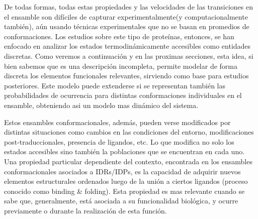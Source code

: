 De todas formas, todas estas propiedades y las velocidades de las transiciones en el ensamble son difíciles de capturar experimentalmente(y computacionalmente también), aún usando técnicas experimentales que no se basan en promedios de conformaciones.
Los estudios sobre este tipo de proteínas, entonces, se han enfocado en analizar los estados termodinámicamente accesibles como entidades discretas.
Como veremos a continuación y en las proximas secciones, esta idea, si bien sabemos que es una descripción incompleta, permite modelar de forma discreta los elementos funcionales relevantes, sirviendo como base para estudios posteriores.
Este modelo puede extenderse si se representan también las probabilidades de ocurrencia para distintas conformaciones individuales en el ensamble, obteniendo asi un modelo mas dinámico del sistema.






Estos ensambles conformacionales, además, pueden verse modificados por distintas situaciones como cambios en las condiciones del entorno, modificaciones post-traduccionales, presencia de ligandos, etc.
Lo que modifica no solo los estados accesibles sino también la poblaciones que se encuentran en cada uno.
Una propiedad particular dependiente del contexto, encontrada en los ensambles conformacionales asociados a IDRs/IDPs, es la capacidad de adquirir nuevos elementos estructurales ordenados luego de la unión a ciertos ligandos
(proceso conocido como binding \& folding)\cite{dyson2005intrinsically}. Esta propiedad es mas relevante cuando se sabe que, generalmente, está asociada a su funcionalidad biológica, y ocurre previamente o durante la realización de esta función.

